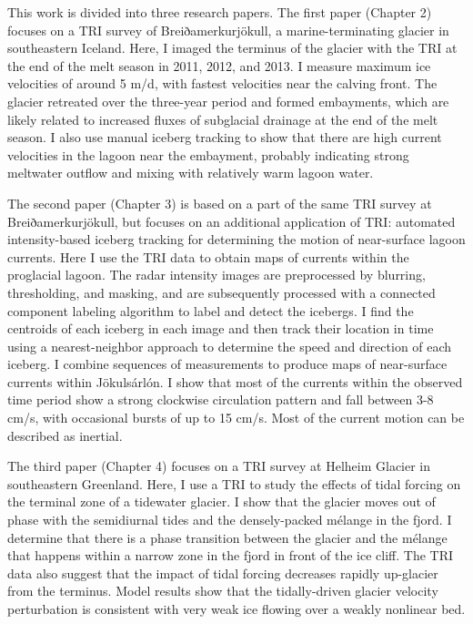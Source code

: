 This work is divided into three research papers. The first paper (Chapter 2) focuses on a TRI survey of Breiðamerkurjökull, a marine-terminating glacier in southeastern Iceland. Here, I imaged the terminus of the glacier with the TRI at the end of the melt season in 2011, 2012, and 2013. I measure maximum ice velocities of around 5 m/d, with fastest velocities near the calving front. The glacier retreated over the three-year period and formed embayments, which are likely related to increased fluxes of subglacial drainage at the end of the melt season. I also use manual iceberg tracking to show that there are high current velocities in the lagoon near the embayment, probably indicating strong meltwater outflow and mixing with relatively warm lagoon water.

The second paper (Chapter 3) is based on a part of the same TRI survey at Breiðamerkurjökull, but focuses on an additional application of TRI: automated intensity-based iceberg tracking for determining the motion of near-surface lagoon currents. Here I use the TRI data to obtain maps of currents within the proglacial lagoon. The radar intensity images are preprocessed by blurring, thresholding, and masking, and are subsequently processed with a connected component labeling algorithm to
label and detect the icebergs. I find the centroids of each iceberg in each image and then
track their location in time using a nearest-neighbor approach to determine the speed and direction of each iceberg. I combine sequences of measurements to produce maps of near-surface currents within Jökulsárlón. I show that most of the currents within the observed time period show a strong clockwise circulation pattern and fall between 3-8 cm/s, with occasional bursts of up to 15 cm/s. Most of the current motion can be described as inertial.

The third paper (Chapter 4) focuses on a TRI survey at Helheim Glacier in southeastern Greenland.  Here, I use a TRI to study the effects of tidal forcing on the terminal zone of a tidewater glacier. I show that the glacier moves out of phase with the semidiurnal tides and
the densely-packed mélange in the fjord.  I determine that there is a phase transition between the glacier and the mélange that happens within a narrow zone in the fjord in front of the ice cliff. The TRI data also suggest that the impact of tidal forcing decreases rapidly up-glacier from the terminus. Model results show that the tidally-driven glacier velocity perturbation is consistent with very weak ice flowing over a weakly nonlinear bed.


